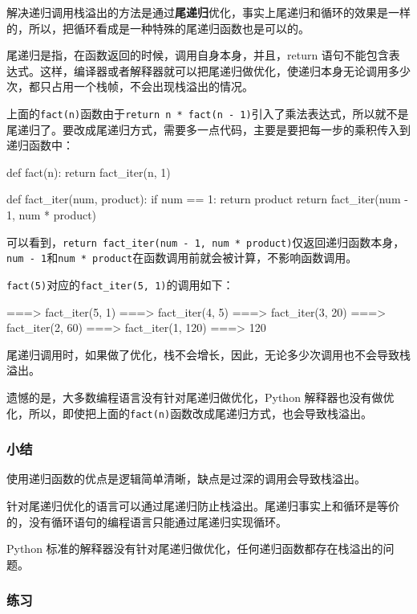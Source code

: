 解决递归调用栈溢出的方法是通过\textbf{尾递归}优化，事实上尾递归和循环的效果是一样的，所以，把循环看成是一种特殊的尾递归函数也是可以的。

尾递归是指，在函数返回的时候，调用自身本身，并且，return
语句不能包含表达式。这样，编译器或者解释器就可以把尾递归做优化，使递归本身无论调用多少次，都只占用一个栈帧，不会出现栈溢出的情况。

上面的\texttt{fact(n)}函数由于\texttt{return\ n\ *\ fact(n\ -\ 1)}引入了乘法表达式，所以就不是尾递归了。要改成尾递归方式，需要多一点代码，主要是要把每一步的乘积传入到递归函数中：

\begin{pythoncode}
def fact(n):
    return fact_iter(n, 1)

def fact_iter(num, product):
    if num == 1:
        return product
    return fact_iter(num - 1, num * product)
\end{pythoncode}

可以看到，\texttt{return\ fact\_iter(num\ -\ 1,\ num\ *\ product)}仅返回递归函数本身，\texttt{num\ -\ 1}和\texttt{num\ *\ product}在函数调用前就会被计算，不影响函数调用。

\texttt{fact(5)}对应的\texttt{fact\_iter(5,\ 1)}的调用如下：

\begin{pythoncode}
===> fact_iter(5, 1)
===> fact_iter(4, 5)
===> fact_iter(3, 20)
===> fact_iter(2, 60)
===> fact_iter(1, 120)
===> 120
\end{pythoncode}

尾递归调用时，如果做了优化，栈不会增长，因此，无论多少次调用也不会导致栈溢出。

遗憾的是，大多数编程语言没有针对尾递归做优化，Python
解释器也没有做优化，所以，即使把上面的\texttt{fact(n)}函数改成尾递归方式，也会导致栈溢出。

\hypertarget{ux5c0fux7ed3}{%
\subsubsection{小结}\label{ux5c0fux7ed3}}

使用递归函数的优点是逻辑简单清晰，缺点是过深的调用会导致栈溢出。

针对尾递归优化的语言可以通过尾递归防止栈溢出。尾递归事实上和循环是等价的，没有循环语句的编程语言只能通过尾递归实现循环。

Python
标准的解释器没有针对尾递归做优化，任何递归函数都存在栈溢出的问题。

\hypertarget{ux7ec3ux4e60}{%
\subsubsection{练习}\label{ux7ec3ux4e60}}

